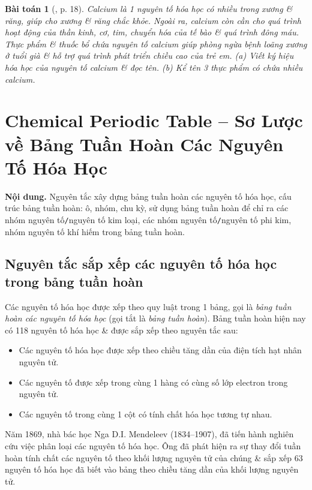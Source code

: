 \documentclass{article}
\newtheorem{baitoan}{Bài toán}
\begin{document}
\begin{baitoan}[\cite{SGK_KHTN_7_Canh_Dieu}, p. 18]
	Calcium là 1 nguyên tố hóa học có nhiều trong xương \& răng, giúp cho xương \& răng chắc khỏe. Ngoài ra, calcium còn cần cho quá trình hoạt động của thần kinh, cơ, tim, chuyển hóa của tế bào \& quá trình đông máu. Thực phẩm \& thuốc bổ chứa nguyên tố calcium giúp phòng ngừa bệnh loãng xương ở tuổi già \& hỗ trợ quá trình phát triển chiều cao của trẻ em. (a) Viết ký hiệu hóa học của nguyên tố calcium \& đọc tên. (b) Kể tên 3 thực phẩm có chứa nhiều calcium.
\end{baitoan}
\noindent{}


\section{Chemical Periodic Table -- Sơ Lược về Bảng Tuần Hoàn Các Nguyên Tố Hóa Học}
\textsf{\textbf{Nội dung.} Nguyên tắc xây dựng bảng tuần hoàn các nguyên tố hóa học, cấu trúc bảng tuần hoàn: ô, nhóm, chu kỳ, sử dụng bảng tuần hoàn để chỉ ra các nhóm nguyên tố\texttt{/}nguyên tố kim loại, các nhóm nguyên tố\texttt{/}nguyên tố phi kim, nhóm nguyên tố khí hiếm trong bảng tuần hoàn.}

\subsection{Nguyên tắc sắp xếp các nguyên tố hóa học trong bảng tuần hoàn}
Các nguyên tố hóa học được xếp theo quy luật trong 1 bảng, gọi là \textit{bảng tuần hoàn các nguyên tố hóa học} (gọi tắt là \textit{bảng tuần hoàn}). Bảng tuần hoàn hiện nay có 118 nguyên tố hóa học \& được sắp xếp theo nguyên tắc sau:
\begin{itemize}
	\item Các nguyên tố hóa học được xếp theo chiều tăng dần của điện tích hạt nhân nguyên tử.
	\item Các nguyên tố được xếp trong cùng 1 hàng có cùng số lớp electron trong nguyên tử.
	\item Các nguyên tố trong cùng 1 cột có tính chất hóa học tương tự nhau.
\end{itemize}
Năm 1869, nhà bác học Nga D.I. Mendeleev (1834--1907), đã tiến hành nghiên cứu việc phân loại các nguyên tố hóa học. Ông đã phát hiện ra sự thay đổi tuần hoàn tính chất các nguyên tố theo khối lượng nguyên tử của chúng \& sắp xếp 63 nguyên tố hóa học đã biết vào bảng theo chiều tăng dần của khối lượng nguyên tử.
\end{document}
